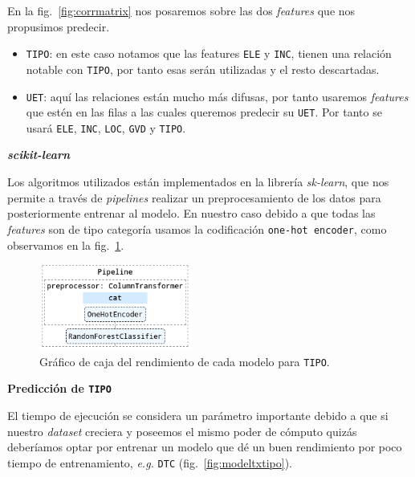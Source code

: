 \documentclass[a4paper,12pt]{article}
\begin{document}
En la fig.~\ref{fig:corrmatrix} nos posaremos sobre las dos \textit{features} que nos propusimos predecir.

\begin{itemize}
	\item \texttt{TIPO}: en este caso notamos que las features \texttt{ELE} y \texttt{INC}, tienen una relación notable con \texttt{TIPO}, por tanto esas serán utilizadas y el resto descartadas.
	\item \texttt{UET}: aquí las relaciones están mucho más difusas, por tanto usaremos \textit{features} que estén en las filas a las cuales queremos predecir su \texttt{UET}. Por tanto se usará \texttt{ELE}, \texttt{INC}, \texttt{LOC}, \texttt{GVD} y \texttt{TIPO}.
\end{itemize}

\textbf{\textit{scikit-learn}}

Los algoritmos utilizados están implementados en la librería \textit{sk-learn}, que nos permite a través de \textit{pipelines} realizar un preprocesamiento de los datos para posteriormente entrenar al modelo. En nuestro caso debido a que todas las \textit{features} son de tipo categoría usamos la codificación \texttt{one-hot encoder}, como observamos en la fig.~\ref{fig:sklearn}.

\begin{figure}[H]
	\begin{center}
	\includegraphics[width=0.45\textwidth]{tesis_74.png}
  	\caption{Gráfico de caja del rendimiento de cada modelo para \texttt{TIPO}.}
  	\label{fig:sklearn}
  	\end{center}
\end{figure}

\textbf{Predicción de \texttt{TIPO}}

El tiempo de ejecución se considera un parámetro importante debido a que si nuestro \textit{dataset} creciera y poseemos el mismo poder de cómputo quizás deberíamos optar por entrenar un modelo que dé un buen rendimiento por poco tiempo de entrenamiento, \textit{e.g.} \texttt{DTC} (fig.~\ref{fig:modeltxtipo}).
\end{document}
